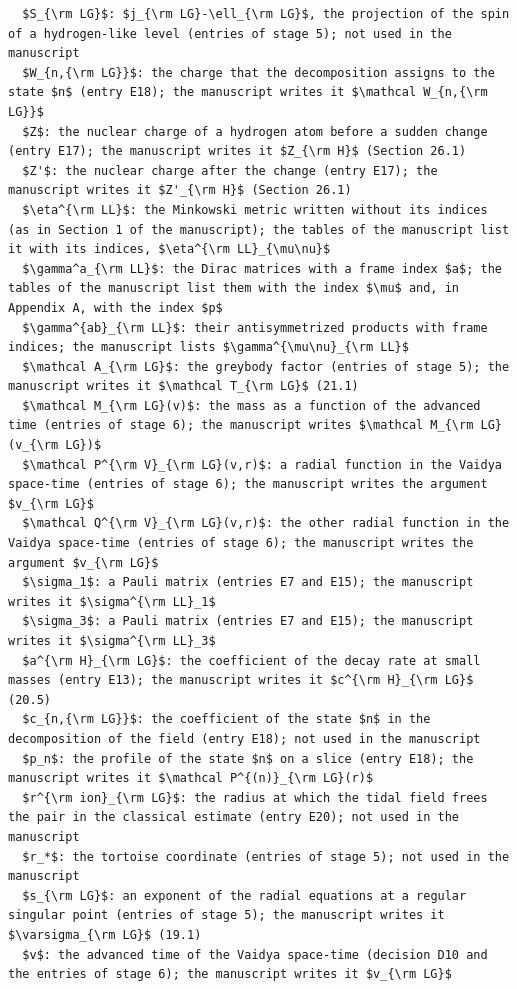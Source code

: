 \documentclass[
  10pt,
]{article}
\begin{document}
\begin{verbatim}
  $S_{\rm LG}$: $j_{\rm LG}-\ell_{\rm LG}$, the projection of the spin of a hydrogen-like level (entries of stage 5); not used in the manuscript
  $W_{n,{\rm LG}}$: the charge that the decomposition assigns to the state $n$ (entry E18); the manuscript writes it $\mathcal W_{n,{\rm LG}}$
  $Z$: the nuclear charge of a hydrogen atom before a sudden change (entry E17); the manuscript writes it $Z_{\rm H}$ (Section 26.1)
  $Z'$: the nuclear charge after the change (entry E17); the manuscript writes it $Z'_{\rm H}$ (Section 26.1)
  $\eta^{\rm LL}$: the Minkowski metric written without its indices (as in Section 1 of the manuscript); the tables of the manuscript list it with its indices, $\eta^{\rm LL}_{\mu\nu}$
  $\gamma^a_{\rm LL}$: the Dirac matrices with a frame index $a$; the tables of the manuscript list them with the index $\mu$ and, in Appendix A, with the index $p$
  $\gamma^{ab}_{\rm LL}$: their antisymmetrized products with frame indices; the manuscript lists $\gamma^{\mu\nu}_{\rm LL}$
  $\mathcal A_{\rm LG}$: the greybody factor (entries of stage 5); the manuscript writes it $\mathcal T_{\rm LG}$ (21.1)
  $\mathcal M_{\rm LG}(v)$: the mass as a function of the advanced time (entries of stage 6); the manuscript writes $\mathcal M_{\rm LG}(v_{\rm LG})$
  $\mathcal P^{\rm V}_{\rm LG}(v,r)$: a radial function in the Vaidya space-time (entries of stage 6); the manuscript writes the argument $v_{\rm LG}$
  $\mathcal Q^{\rm V}_{\rm LG}(v,r)$: the other radial function in the Vaidya space-time (entries of stage 6); the manuscript writes the argument $v_{\rm LG}$
  $\sigma_1$: a Pauli matrix (entries E7 and E15); the manuscript writes it $\sigma^{\rm LL}_1$
  $\sigma_3$: a Pauli matrix (entries E7 and E15); the manuscript writes it $\sigma^{\rm LL}_3$
  $a^{\rm H}_{\rm LG}$: the coefficient of the decay rate at small masses (entry E13); the manuscript writes it $c^{\rm H}_{\rm LG}$ (20.5)
  $c_{n,{\rm LG}}$: the coefficient of the state $n$ in the decomposition of the field (entry E18); not used in the manuscript
  $p_n$: the profile of the state $n$ on a slice (entry E18); the manuscript writes it $\mathcal P^{(n)}_{\rm LG}(r)$
  $r^{\rm ion}_{\rm LG}$: the radius at which the tidal field frees the pair in the classical estimate (entry E20); not used in the manuscript
  $r_*$: the tortoise coordinate (entries of stage 5); not used in the manuscript
  $s_{\rm LG}$: an exponent of the radial equations at a regular singular point (entries of stage 5); the manuscript writes it $\varsigma_{\rm LG}$ (19.1)
  $v$: the advanced time of the Vaidya space-time (decision D10 and the entries of stage 6); the manuscript writes it $v_{\rm LG}$

\end{verbatim}
\end{document}
